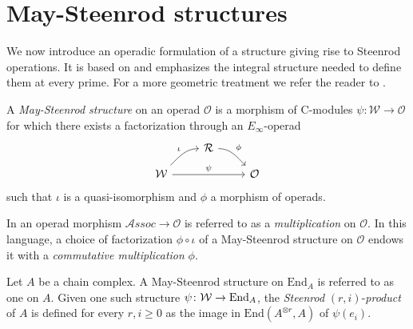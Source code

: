 
\section{May-Steenrod structures} \label{s:steenrod}

We now introduce an operadic formulation of a structure giving rise to Steenrod operations.
It is based on \cites{steenrod47products, steenrod53symmetric, steenrod53cyclic, may70generalapproach} and emphasizes the integral structure needed to define them at every prime.
For a more geometric treatment we refer the reader to \cites{may72geometry, may76homology, lawson2020n}.

\begin{definition} \label{def: May-Steenrod structure}
	A \textit{May-Steenrod structure} on an operad $\mathcal O$ is a 
	morphism of $\mathrm{C}$-modules $\psi \colon \mathcal W \to \mathcal O$ for which there exists a factorization through an $E_\infty$-operad
	\begin{equation*}
	\begin{tikzcd}[column sep = normal, row sep = small]
	& \mathcal R \arrow[dr, "\phi", out=0] & \\
	\mathcal W \arrow[ur, "\iota", in=180] \arrow[rr, "\psi"] & & \mathcal O
	\end{tikzcd}
	\end{equation*}
	such that $\iota$ is a quasi-isomorphism and $\phi$ a morphism of operads.
\end{definition}

\begin{remark} \label{rmk: Deligne conjecture}
	In \cite{GerstenhaberVoronov} an operad morphism $\mathcal{A}ssoc \to \mathcal O$ is referred to as a \textit{multiplication} on $\mathcal O$. In this language, a choice of factorization $\phi \circ \iota$ of a May-Steenrod structure on $\mathcal O$ endows it with a \textit{commutative multiplication} $\phi$.
\end{remark}

\begin{definition} \label{def: Steenrod products}
	Let $A$ be a chain complex.
	A May-Steenrod structure on $\mathrm{End}_A$ is referred to as one on $A$.
	Given one such structure $\psi \colon \mathcal W \to \mathrm{End}_A$, the \textit{Steenrod} $(r, i)$-\textit{product} of $A$ is defined for every $r, i \geq 0$ as the image in $ \mathrm{End}(A^{\otimes r}, A)$ of $\psi(e_i)$.
\end{definition}

